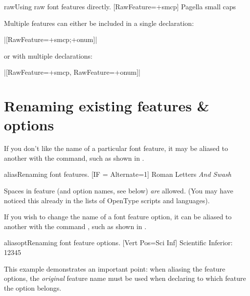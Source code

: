 \documentclass[a4paper]{l3doc}
\begin{document}
\begin{Xexample}{raw}{Using raw font features directly.}
  [RawFeature=+smcp]
  Pagella small caps
\end{Xexample}

Multiple features can either be included in a single declaration:\par
{\centering|[RawFeature=+smcp;+onum]|\par}
\noindent or with multiple declarations:\par
{\centering|[RawFeature=+smcp, RawFeature=+onum]|\par}


\section{Renaming existing features \& options}
\label{sec:aliasfontfeature}

\DescribeMacro{\aliasfontfeature}
If you don't like the name of a particular font feature,
it may be aliased to another with the
 command,
such as shown in .

\begin{Xexample}{alias}{Renaming font features.}
  [IF = {Alternate=1}]
  Roman Letters \itshape And Swash
\end{Xexample}

Spaces in feature (and option names, see below) \emph{are} allowed. (You may have
noticed this already in the lists of OpenType scripts and languages).

\DescribeMacro{\aliasfontfeatureoption}
If you wish to change the name of a font feature option,
it can be aliased to another with the command
, such as shown in .

\begin{Lexample}{aliasopt}{Renaming font feature options.}
  [Vert Pos=Sci Inf]
   Scientific Inferior: 12345
\end{Lexample}

This example demonstrates an important point: when aliasing the feature
options, the \emph{original} feature name must be used when declaring
to which feature the option belongs.
\end{document}
